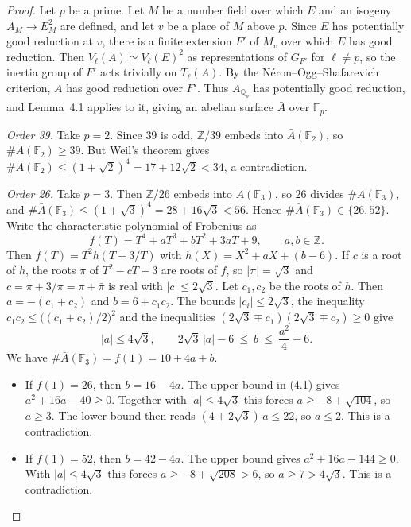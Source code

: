 \documentclass[11pt]{article}
\newcommand{\Q}{\mathbb Q}
\newcommand{\Z}{\mathbb Z}
\newcommand{\F}{\mathbb F}
\begin{document}
\begin{proof}
Let \(p\) be a prime. Let \(M\) be a number field over which \(E\) and
an isogeny \(A_M\to E_M^2\) are defined, and let \(v\) be a place of
\(M\) above \(p\). Since \(E\) has potentially good reduction at \(v\),
there is a finite extension \(F'\) of \(M_v\) over which \(E\) has good
reduction. Then \(V_\ell(A)\simeq V_\ell(E)^2\) as representations of
\(G_{F'}\) for \(\ell\ne p\), so the inertia group of \(F'\) acts
trivially on \(T_\ell(A)\). By the N\'eron--Ogg--Shafarevich criterion,
\(A\) has good reduction over \(F'\). Thus \(A_{\Q_p}\) has potentially
good reduction, and Lemma~4.1 applies to it, giving an abelian surface
\(\bar A\) over \(\F_p\).

\emph{Order 39.} Take \(p=2\). Since \(39\) is odd, \(\Z/39\) embeds
into \(\bar A(\F_2)\), so \(\#\bar A(\F_2)\ge39\). But Weil's theorem
gives \(\#\bar A(\F_2)\le(1+\sqrt2)^4=17+12\sqrt2<34\), a
contradiction.

\emph{Order 26.} Take \(p=3\). Then \(\Z/26\) embeds into
\(\bar A(\F_3)\), so \(26\) divides \(\#\bar A(\F_3)\), and
\(\#\bar A(\F_3)\le(1+\sqrt3)^4=28+16\sqrt3<56\). Hence
\(\#\bar A(\F_3)\in\{26,52\}\). Write the characteristic polynomial of
Frobenius as
\[
f(T)=T^4+aT^3+bT^2+3aT+9,\qquad a,b\in\Z .
\]
Then \(f(T)=T^2h(T+3/T)\) with \(h(X)=X^2+aX+(b-6)\). If \(c\) is a
root of \(h\), the roots \(\pi\) of \(T^2-cT+3\) are roots of \(f\),
so \(|\pi|=\sqrt3\) and \(c=\pi+3/\pi=\pi+\bar\pi\) is real with
\(|c|\le2\sqrt3\). Let \(c_1,c_2\) be the roots of \(h\). Then
\(a=-(c_1+c_2)\) and \(b=6+c_1c_2\). The bounds \(|c_i|\le2\sqrt3\),
the inequality \(c_1c_2\le\big((c_1+c_2)/2\big)^2\) and the
inequalities \((2\sqrt3\mp c_1)(2\sqrt3\mp c_2)\ge0\) give
\[
|a|\le4\sqrt3,\qquad 2\sqrt3\,|a|-6\ \le\ b\ \le\ \frac{a^2}{4}+6.
\tag{4.1}
\]
We have \(\#\bar A(\F_3)=f(1)=10+4a+b\).
\begin{itemize}
\item If \(f(1)=26\), then \(b=16-4a\). The upper bound in (4.1) gives
\(a^2+16a-40\ge0\). Together with \(|a|\le4\sqrt3\) this forces
\(a\ge-8+\sqrt{104}\), so \(a\ge3\). The lower bound then reads
\((4+2\sqrt3)\,a\le22\), so \(a\le2\). This is a contradiction.
\item If \(f(1)=52\), then \(b=42-4a\). The upper bound gives
\(a^2+16a-144\ge0\). With \(|a|\le4\sqrt3\) this forces
\(a\ge-8+\sqrt{208}>6\), so \(a\ge7>4\sqrt3\). This is a
contradiction.\qedhere
\end{itemize}
\end{proof}
\end{document}
